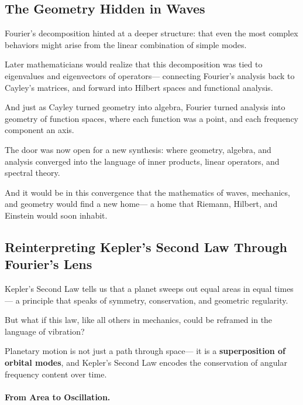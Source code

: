 \subsection{The Geometry Hidden in Waves}

Fourier’s decomposition hinted at a deeper structure:  
that even the most complex behaviors might arise from the linear combination of simple modes.

Later mathematicians would realize that this decomposition was tied to eigenvalues and eigenvectors of operators—  
connecting Fourier’s analysis back to Cayley’s matrices, and forward into Hilbert spaces and functional analysis.

And just as Cayley turned geometry into algebra,  
Fourier turned analysis into geometry of function spaces,  
where each function was a point, and each frequency component an axis.

The door was now open for a new synthesis:  
where geometry, algebra, and analysis converged into the language of inner products, linear operators, and spectral theory.

And it would be in this convergence that the mathematics of waves, mechanics, and geometry would find a new home—  
a home that Riemann, Hilbert, and Einstein would soon inhabit.


\subsection{Reinterpreting Kepler’s Second Law Through Fourier’s Lens}

Kepler’s Second Law tells us that a planet sweeps out equal areas in equal times—  
a principle that speaks of symmetry, conservation, and geometric regularity.

But what if this law, like all others in mechanics, could be reframed in the language of vibration?

\bigskip

\begin{tcolorbox}[colback=purple!5!white, colframe=purple!80!black, title=\textbf{Fourier's View: Kepler as Spectral Balance}]
Planetary motion is not just a path through space—  
it is a \textbf{superposition of orbital modes},  
and Kepler’s Second Law encodes the conservation of angular frequency content over time.
\end{tcolorbox}

\bigskip

\paragraph{From Area to Oscillation.}

